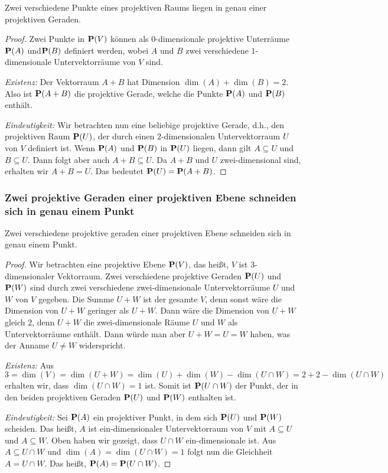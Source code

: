 \begin{propn} 
	Zwei verschiedene Punkte eines projektiven Raums liegen in genau einer projektiven Geraden. 
\end{propn} 
\begin{proof}
	Zwei Punkte in $\mathbf{P}(V)$ können als $0$-dimensionale projektive Unterräume $\mathbf{P}(A)$ und$\mathbf{P}(B)$ definiert werden, wobei $A$ und $B$ zwei verschiedene $1$-dimensionale Untervektorräume von $V$ sind. 
	
	\emph{Existenz:} Der Vektorraum $A+B$ hat Dimension $\dim(A) + \dim(B)  = 2$. Also ist $\mathbf{P}(A+B)$ die projektive Gerade, welche die Punkte $\mathbf{P}(A)$ und $\mathbf{P}(B)$ enthält. 
	
	\emph{Eindeutigkeit:} Wir betrachten nun eine beliebige projektive Gerade, d.h., den projektiven Raum $\mathbf{P}(U)$, der durch einen $2$-dimensionalen Untervektorraum $U$ von $V$ definiert ist. Wenn $\mathbf{P}(A)$ und $\mathbf{P}(B)$ in $\mathbf{P}(U)$ liegen, dann gilt $A \subseteq U$ und $B \subseteq U$. Dann folgt aber auch $A + B \subseteq U$. Da $A+B$ und $U$ zwei-dimensional sind, erhalten wir $A + B= U$.  Das bedeutet $\mathbf{P}(U) = \mathbf{P}(A+B)$. 
\end{proof} 

\subsubsection{Zwei projektive Geraden einer projektiven Ebene schneiden sich in genau einem Punkt} 

\begin{propn}
	Zwei verschiedene projektive geraden einer projektiven Ebene schneiden sich in genau einem Punkt. 
\end{propn} 
\begin{proof}
	Wir betrachten eine projektive Ebene $\mathbf{P}(V)$, das heißt, $V$ ist $3$-dimensionaler Vektorraum. Zwei verschiedene projektive Geraden $\mathbf{P}(U)$ und $\mathbf{P}(W)$ sind durch zwei verschiedene zwei-dimensionale Untervektorräume $U$ und $W$ von $V$ gegeben. Die Summe $U+W$ ist der gesamte $V$, denn sonst wäre die Dimension von $U+W$ geringer als $U+W$. Dann wäre die Dimension von $U+W$ gleich $2$, denn $U+W$ die zwei-dimensionale Räume $U$ und $W$ als Untervektorräume enthält. Dann würde man aber $U+W = U = W$ haben, was der Anname $U \ne W$ widerspricht. 
	
	\emph{Existenz:} Aus $3 = \dim(V) = \dim(U+W) = \dim(U) + \dim(W) - \dim(U \cap W) = 2 + 2 - \dim(U \cap W)$ erhalten wir, dass $\dim(U \cap W) = 1$ ist. Somit ist $\mathbf{P}(U \cap W)$ der Punkt, der in den beiden projektiven Geraden $\mathbf{P}(U)$ und $\mathbf{P}(W)$ enthalten ist. 
	
	\emph{Eindeutigkeit:} Sei $\mathbf{P}(A)$ ein projektiver Punkt, in dem sich $\mathbf{P}(U)$ und $\mathbf{P}(W)$ scheiden. Das heißt, $A$ ist ein-dimensionaler Untervektorraum von $V$ mit $A \subseteq U$ und $A \subseteq W$. Oben haben wir gezeigt, dass $U \cap W$ ein-dimensionale ist. Aus $A \subseteq U \cap W$ und $\dim(A) = \dim(U \cap W)=1$ folgt nun die Gleichheit $A = U \cap W$. Das heißt, $\mathbf{P}(A) = \mathbf{P}(U \cap W)$. 
\end{proof} 

